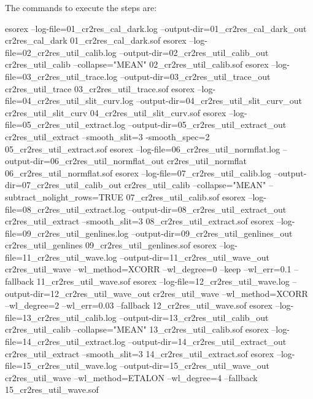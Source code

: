 The commands to execute the steps are:
\begin{shell}[fontsize=\footnotesize]
esorex --log-file=01_cr2res_cal_dark.log --output-dir=01_cr2res_cal_dark_out cr2res_cal_dark 
  01_cr2res_cal_dark.sof
esorex --log-file=02_cr2res_util_calib.log --output-dir=02_cr2res_util_calib_out 
  cr2res_util_calib --collapse="MEAN" 02_cr2res_util_calib.sof
esorex --log-file=03_cr2res_util_trace.log --output-dir=03_cr2res_util_trace_out    
  cr2res_util_trace 03_cr2res_util_trace.sof
esorex --log-file=04_cr2res_util_slit_curv.log --output-dir=04_cr2res_util_slit_curv_out
  cr2res_util_slit_curv 04_cr2res_util_slit_curv.sof
esorex --log-file=05_cr2res_util_extract.log --output-dir=05_cr2res_util_extract_out
  cr2res_util_extract --smooth_slit=3 -smooth_spec=2 
  05_cr2res_util_extract.sof
esorex --log-file=06_cr2res_util_normflat.log --output-dir=06_cr2res_util_normflat_out 
  cr2res_util_normflat 06_cr2res_util_normflat.sof
esorex --log-file=07_cr2res_util_calib.log --output-dir=07_cr2res_util_calib_out 
  cr2res_util_calib --collapse="MEAN" --subtract_nolight_rows=TRUE 07_cr2res_util_calib.sof
esorex --log-file=08_cr2res_util_extract.log --output-dir=08_cr2res_util_extract_out  
  cr2res_util_extract --smooth_slit=3  08_cr2res_util_extract.sof
esorex --log-file=09_cr2res_util_genlines.log  --output-dir=09_cr2res_util_genlines_out  
  cr2res_util_genlines 09_cr2res_util_genlines.sof
esorex --log-file=11_cr2res_util_wave.log --output-dir=11_cr2res_util_wave_out 
  cr2res_util_wave --wl_method=XCORR --wl_degree=0 --keep --wl_err=0.1 --fallback 
11_cr2res_util_wave.sof
esorex --log-file=12_cr2res_util_wave.log --output-dir=12_cr2res_util_wave_out 
  cr2res_util_wave --wl_method=XCORR --wl_degree=2 --wl_err=0.03 --fallback 
  12_cr2res_util_wave.sof
esorex --log-file=13_cr2res_util_calib.log --output-dir=13_cr2res_util_calib_out 
  cr2res_util_calib --collapse="MEAN" 13_cr2res_util_calib.sof
esorex --log-file=14_cr2res_util_extract.log --output-dir=14_cr2res_util_extract_out 
  cr2res_util_extract --smooth_slit=3 14_cr2res_util_extract.sof
esorex --log-file=15_cr2res_util_wave.log --output-dir=15_cr2res_util_wave_out 
  cr2res_util_wave --wl_method=ETALON --wl_degree=4 --fallback 15_cr2res_util_wave.sof
\end{shell}


